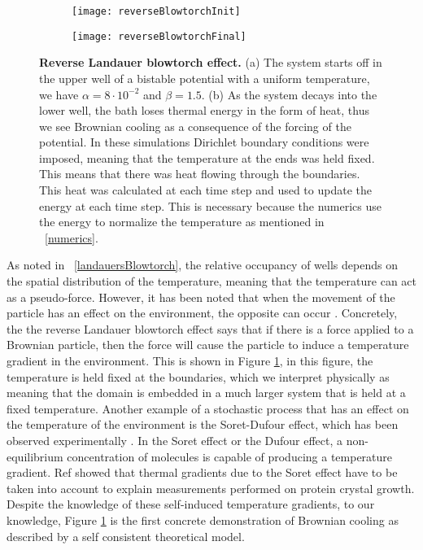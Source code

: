 \begin{figure}
	\begin{subfigure}{0.49\textwidth}
		\texttt{[image: reverseBlowtorchInit]}
	\end{subfigure}
	\begin{subfigure}{0.49\textwidth}
		\texttt{[image: reverseBlowtorchFinal]}
	\end{subfigure}
	\caption{\textbf{Reverse Landauer blowtorch effect.} (a) The system starts off in the upper well of a bistable potential with a uniform temperature, we have $\alpha = 8 \cdot 10^{-2}$ and $\beta = 1.5$. (b) As the system decays into the lower well, the bath loses thermal energy in the form of heat, thus we see Brownian cooling as a consequence of the forcing of the potential. In these simulations Dirichlet boundary conditions were imposed, meaning that the temperature at the ends was held fixed. This means that there was heat flowing through the boundaries. This heat was calculated at each time step and used to update the energy at each time step. This is necessary because the numerics use the energy to normalize the temperature as mentioned in ~\autoref{numerics}. \label{fig:reverseBlowtorch}}
\end{figure}
As noted in ~\autoref{landauersBlowtorch}, the relative occupancy of wells depends on the spatial distribution of the temperature, meaning that the temperature can act as a pseudo-force. However, it has been noted that when the movement of the particle has an effect on the environment, the opposite can occur \cite{DasDasBarikEtAl2015}. Concretely, the the reverse Landauer blowtorch effect says that if there is a force applied to a Brownian particle, then the force will cause the particle to induce a temperature gradient in the environment. This is shown in Figure \ref{fig:reverseBlowtorch}, in this figure, the temperature is held fixed at the boundaries, which we interpret physically as meaning that the domain is embedded in a much larger system that is held at a fixed temperature. Another example of a stochastic process that has an effect on the temperature of the environment is the Soret-Dufour effect, which has been observed experimentally \cite{Onsager1931,HortLinzLuecke1992,PiazzaGuarino2002}. In the Soret effect or the Dufour effect, a non-equilibrium concentration of molecules is capable of producing a temperature gradient. Ref \cite{Santamaria-HolekGadomskiRubi2011} showed that thermal gradients due to the Soret effect have to be taken into account to explain measurements performed on protein crystal growth. Despite the knowledge of these self-induced temperature gradients, to our knowledge, Figure \ref{fig:reverseBlowtorch} is the first concrete demonstration of Brownian cooling as described by a self consistent theoretical model.

